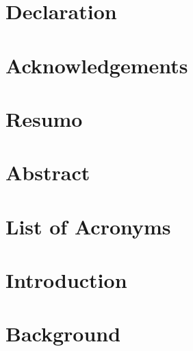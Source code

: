 \documentclass[10pt]{esda}
\begin{document}
\clearpage
\thispagestyle{empty}
\cleardoublepage


\section*{Declaration}


\cleardoublepage
\section*{Acknowledgements}


\cleardoublepage
\section*{Resumo}


\vfill

\section*{}


\cleardoublepage
\section*{Abstract}


\vfill

\section*{}


\cleardoublepage
\tableofcontents
\cleardoublepage
\listoftables
\cleardoublepage
\listoffigures

\cleardoublepage
\section*{List of Acronyms}
\label{sec:acronyms}

\cleardoublepage


\section{Introduction}
\label{sec:intro}


\cleardoublepage
\section{Background}
\label{sec:back}

\end{document}
